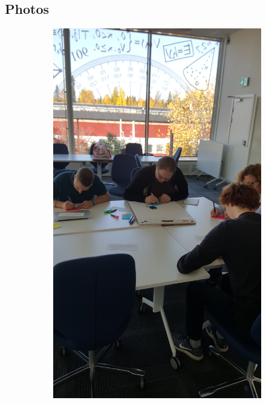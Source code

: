 \vfill
\subsection*{Photos}
\begin{figure}[ht]
\centering
    \begin{subfigure}{.32\textwidth}
        \centering
        \includegraphics[width=\textwidth, angle=270, origin=c]{img/workshop1.jpg}
        \label{fig:workshop1}
    \end{subfigure}

\end{figure}

